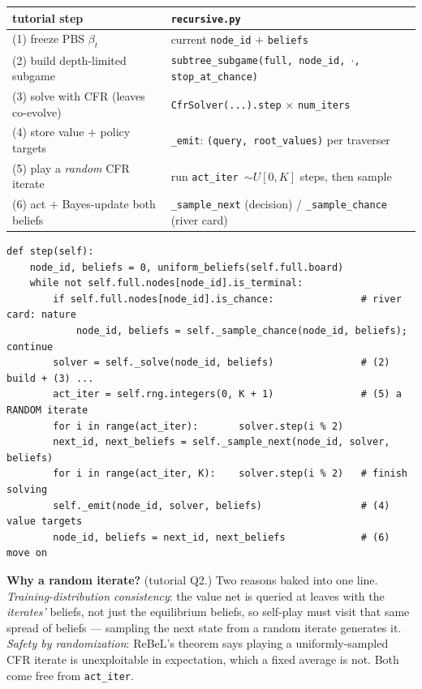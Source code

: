 \documentclass[11pt,a4paper]{article}
\newcommand{\file}[1]{\textcolor{accent}{\texttt{#1}}}
\newcommand{\fn}[1]{\texttt{#1}}
\begin{document}
\begin{center}\small
\begin{tabular}{@{}p{}p{}@{}}
\toprule
tutorial step & \file{recursive.py} \\
\midrule
(1) freeze PBS $\beta_t$            & current \texttt{node\_id} $+$ \texttt{beliefs} \\
(2) build depth-limited subgame     & \fn{subtree\_subgame(full, node\_id, $\cdot$, stop\_at\_chance)} \\
(3) solve with CFR (leaves co-evolve)& \fn{CfrSolver(...).step} $\times$ \texttt{num\_iters} \\
(4) store value $+$ policy targets   & \fn{\_emit}: \texttt{(query, root\_values)} per traverser \\
(5) play a \emph{random} CFR iterate & run \texttt{act\_iter $\sim U[0,K]$} steps, then sample \\
(6) act $+$ Bayes-update both beliefs& \fn{\_sample\_next} (decision) / \fn{\_sample\_chance} (river card) \\
\bottomrule
\end{tabular}
\end{center}

\begin{lstlisting}[style=py, caption={\file{recursive.py} --- one self-play hand. The ``play a random iterate'' safety trick (step 5) is the \texttt{act\_iter} split: solve a uniformly-random number of CFR iterations, sample the next state from \emph{that} iterate's strategy, then finish solving and emit the average-strategy value as the label.}]
def step(self):
    node_id, beliefs = 0, uniform_beliefs(self.full.board)
    while not self.full.nodes[node_id].is_terminal:
        if self.full.nodes[node_id].is_chance:               # river card: nature
            node_id, beliefs = self._sample_chance(node_id, beliefs); continue
        solver = self._solve(node_id, beliefs)               # (2) build + (3) ...
        act_iter = self.rng.integers(0, K + 1)               # (5) a RANDOM iterate
        for i in range(act_iter):       solver.step(i % 2)
        next_id, next_beliefs = self._sample_next(node_id, solver, beliefs)
        for i in range(act_iter, K):    solver.step(i % 2)   # finish solving
        self._emit(node_id, solver, beliefs)                 # (4) value targets
        node_id, beliefs = next_id, next_beliefs             # (6) move on
\end{lstlisting}

\begin{intuition}
\textbf{Why a random iterate?} (tutorial Q2.) Two reasons baked into one line.
\emph{Training-distribution consistency}: the value net is queried at leaves with
the \emph{iterates'} beliefs, not just the equilibrium beliefs, so self-play must
visit that same spread of beliefs --- sampling the next state from a random
iterate generates it. \emph{Safety by randomization}: ReBeL's theorem says
playing a uniformly-sampled CFR iterate is unexploitable in expectation, which a
fixed average is not. Both come free from \texttt{act\_iter}.
\end{intuition}
\end{document}
